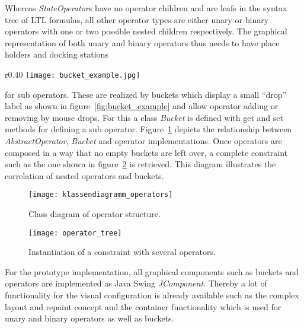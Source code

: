 Whereas \emph{StateOperator}s have no operator children and are leafs in the syntax tree of LTL formulas, all other operator types are either unary or binary operators with one or two possible nested children respectively. 
The graphical representation of both unary and binary operators thus needs to have place holders and docking stations
\begin{wrapfigure}{r}{0.40\textwidth}
  \centering
  \texttt{[image: bucket\_example.jpg]}
  \caption{Buckets for graphical nesting of operators.}
  \label{fig:bucket_example}
\end{wrapfigure}
for sub operators. These are realized by buckets which display a small ``drop'' label as shown in figure~\ref{fig:bucket_example} and allow operator adding or removing by mouse drops.
For this a class \emph{Bucket} is defined with get and set methods for defining a sub operator.
Figure~\ref{fig:klassendiagramm_operators} depicts the relationship between \emph{AbstractOperator}, \emph{Bucket} and operator implementations.
Once operators are composed in a way that no empty buckets are left over, a complete constraint such as the one shown in figure~\ref{fig:operator_tree} is retrieved. This diagram illustrates the correlation of nested operators and buckets.
\begin{figure}[htbp]
  \centering
  \texttt{[image: klassendiagramm\_operators]} 
  \caption{Class diagram of operator structure.}
  \label{fig:klassendiagramm_operators}
\end{figure}

\begin{figure}[htbp]
  \centering
  \texttt{[image: operator\_tree]} 
  \caption{Instantiation of a constraint with several operators.}
  \label{fig:operator_tree}
\end{figure}

For the prototype implementation, all graphical components such as buckets and operators are implemented as Java Swing \emph{JComponent}. Thereby a lot of functionality for the visual configuration is already available such as the complex layout and repaint concept and the container functionality which is used for unary and binary operators as well as buckets.


